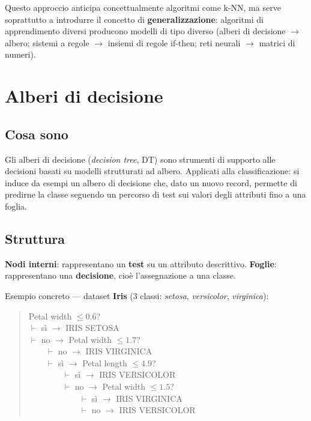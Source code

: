 \documentclass[11pt,a4paper]{report}
\begin{document}
Questo approccio anticipa concettualmente algoritmi come k-NN, ma serve soprattutto a introdurre il concetto di \textbf{generalizzazione}: algoritmi di apprendimento diversi producono modelli di tipo diverso (alberi di decisione $\to$ albero; sistemi a regole $\to$ insiemi di regole if-then; reti neurali $\to$ matrici di numeri).

\section{Alberi di decisione}

\subsection*{Cosa sono}

Gli alberi di decisione (\emph{decision tree}, DT) sono strumenti di supporto alle decisioni basati su modelli strutturati ad albero. Applicati alla classificazione: si induce da esempi un albero di decisione che, dato un nuovo record, permette di predirne la classe seguendo un percorso di test sui valori degli attributi fino a una foglia.

\subsection*{Struttura}

\textbf{Nodi interni}: rappresentano un \textbf{test} su un attributo descrittivo. \textbf{Foglie}: rappresentano una \textbf{decisione}, cioè l'assegnazione a una classe.

Esempio concreto --- dataset \textbf{Iris} (3 classi: \emph{setosa}, \emph{versicolor}, \emph{virginica}):

\begin{quote}
\ttfamily
Petal width $\le 0.6$?\\
$\vdash$ sì $\to$ IRIS SETOSA\\
$\vdash$ no $\to$ Petal width $\le 1.7$?\\
\ \ \ \ $\vdash$ no $\to$ IRIS VIRGINICA\\
\ \ \ \ $\vdash$ sì $\to$ Petal length $\le 4.9$?\\
\ \ \ \ \ \ \ \ $\vdash$ sì $\to$ IRIS VERSICOLOR\\
\ \ \ \ \ \ \ \ $\vdash$ no $\to$ Petal width $\le 1.5$?\\
\ \ \ \ \ \ \ \ \ \ \ \ $\vdash$ sì $\to$ IRIS VIRGINICA\\
\ \ \ \ \ \ \ \ \ \ \ \ $\vdash$ no $\to$ IRIS VERSICOLOR
\end{quote}
\end{document}
